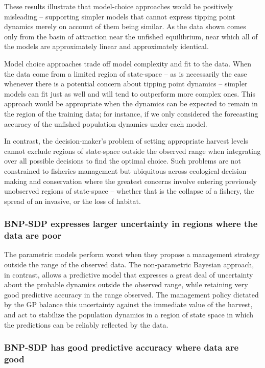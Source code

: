 \documentclass[author-year, review]{elsarticle} %
\begin{document}
These results illustrate that model-choice approaches would be
positively misleading -- supporting simpler models that cannot express
tipping point dynamics merely on account of them being similar. As the
data shown comes only from the basin of attraction near the unfished
equilibrium, near which all of the models are approximately linear and
approximately identical.

Model choice approaches trade off model complexity and fit to the data.
When the data come from a limited region of state-space -- as is
necessarily the case whenever there is a potential concern about tipping
point dynamics -- simpler models can fit just as well and will tend to
outperform more complex ones. This approach would be appropriate when
the dynamics can be expected to remain in the region of the training
data; for instance, if we only considered the forecasting accuracy of
the unfished population dynamics under each model.

In contrast, the decision-maker's problem of setting appropriate harvest
levels cannot exclude regions of state-space outside the observed range
when integrating over all possible decisions to find the optimal choice.
Such problems are not constrained to fisheries management but ubiquitous
across ecological decision-making and conservation where the greatest
concerns involve entering previously unobserved regions of state-space
-- whether that is the collapse of a fishery, the spread of an invasive,
or the loss of habitat.

\subsubsection{BNP-SDP expresses larger uncertainty in regions where the
data are
poor}\label{bnp-sdp-expresses-larger-uncertainty-in-regions-where-the-data-are-poor}

The parametric models perform worst when they propose a management
strategy outside the range of the observed data. The non-parametric
Bayesian approach, in contrast, allows a predictive model that expresses
a great deal of uncertainty about the probable dynamics outside the
observed range, while retaining very good predictive accuracy in the
range observed. The management policy dictated by the GP balance this
uncertainty against the immediate value of the harvest, and act to
stabilize the population dynamics in a region of state space in which
the predictions can be reliably reflected by the data.

\subsubsection{BNP-SDP has good predictive accuracy where data are
good}\label{bnp-sdp-has-good-predictive-accuracy-where-data-are-good}
\end{document}
